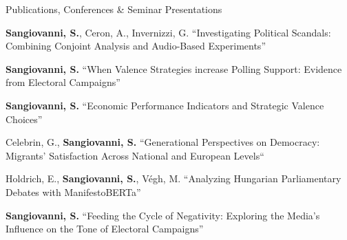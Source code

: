 \documentclass{cv} %
\begin{document}
\begin{rSection}{Publications, Conferences \& Seminar Presentations}
\subtitle{Working Papers}

\begin{rWPSection}
{\textbf{Sangiovanni, S.}, Ceron, A., Invernizzi, G. “Investigating Political Scandals: Combining Conjoint Analysis and Audio-Based Experiments”} 
\end{rWPSection}
\begin{rWPSection}       
{\textbf{Sangiovanni, S.} “When Valence Strategies increase Polling Support: Evidence from Electoral Campaigns”} 
\end{rWPSection}
\begin{rWPSection}       
{\textbf{Sangiovanni, S.} “Economic Performance Indicators and Strategic Valence Choices”} 
\end{rWPSection}
\begin{rWPSection}
{Celebrin, G., \textbf{Sangiovanni, S.} “Generational Perspectives on Democracy: Migrants' Satisfaction Across National and European Levels“}    
\end{rWPSection}    
\begin{rWPSection}    
{Holdrich, E., \textbf{Sangiovanni, S.}, Végh, M. “Analyzing Hungarian Parliamentary Debates with ManifestoBERTa”} 
\end{rWPSection}
\begin{rWPSection}
{\textbf{Sangiovanni, S.} “Feeding the Cycle of Negativity: Exploring the Media's Influence on the Tone of Electoral Campaigns”}
\end{rWPSection}
\end{rSection}
\end{document}
